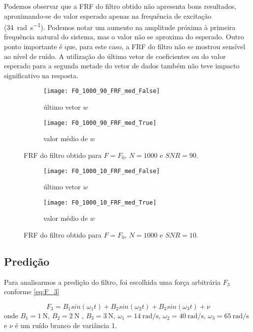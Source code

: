 Podemos observar que a FRF do filtro obtido não apresenta bons resultados, aproximando-se do valor esperado apenas na frequência de excitação (\SI{34}{\radian \per \s}). Podemos notar um aumento na amplitude próxima à primeira frequência natural do sistema, mas o valor não se aproxima do esperado. Outro ponto importante é que, para este caso, a FRF do filtro não se mostrou sensível ao nível de ruído. A utilização do último vetor de coeficientes ou do valor esperado para a segunda metade do vetor de dados também não teve impacto significativo na resposta. 

\begin{figure}
	\centering
	\begin{subfigure}{0.9\textwidth}
		\centering
		\texttt{[image: F0\_1000\_90\_FRF\_med\_False]}
		\caption{último vetor $ w $}
		\label{fig:F0_1000_90_FRF_med_False}
	\end{subfigure}
	\begin{subfigure}{0.9\textwidth}
		\centering
		\texttt{[image: F0\_1000\_90\_FRF\_med\_True]}
		\caption{valor médio de $ w $}
		\label{fig:F0_1000_90_FRF_med_True}
	\end{subfigure}
	\caption{FRF do filtro obtido para $ F=F_0 $, $ N=1000 $ e $ SNR=90 $.}
\end{figure}

\begin{figure}
	\centering
	\begin{subfigure}{0.9\textwidth}
		\centering
		\texttt{[image: F0\_1000\_10\_FRF\_med\_False]}
		\caption{último vetor $ w $}
		\label{fig:F0_1000_10_FRF_med_False}
	\end{subfigure}
	\begin{subfigure}{0.9\textwidth}
		\centering
		\texttt{[image: F0\_1000\_10\_FRF\_med\_True]}
		\caption{valor médio de $ w $}
		\label{fig:F0_1000_10_FRF_med_True}
	\end{subfigure}
	\caption{FRF do filtro obtido para $ F=F_0 $, $ N=1000 $ e $ SNR=10 $.}
	\label{fig:F0_1000_10_FRF}
\end{figure}

\subsection{Predição}

Para analisarmos a predição do filtro, foi escolhida uma força arbitrária $ F_3 $ conforme \cref{eq:F_3}

\begin{equation}\label{eq:F_3}
F_3 = B_1 sin(\omega_1 t)
+ B_2 sin(\omega_2 t)
+ B_3 sin(\omega_3 t)
+ \nu
\end{equation}
onde $ B_1=\SI{1}{\N} $, $ B_2=\SI{2}{\N}$ , $ B_3=\SI{3}{\N} $, $ \omega_1= \SI{14}{\radian \per \s} $, $ \omega_2= \SI{40}{\radian \per \s} $, $ \omega_3= \SI{65}{\radian \per \s} $ e $ \nu $ é um ruído branco de variância 1.

